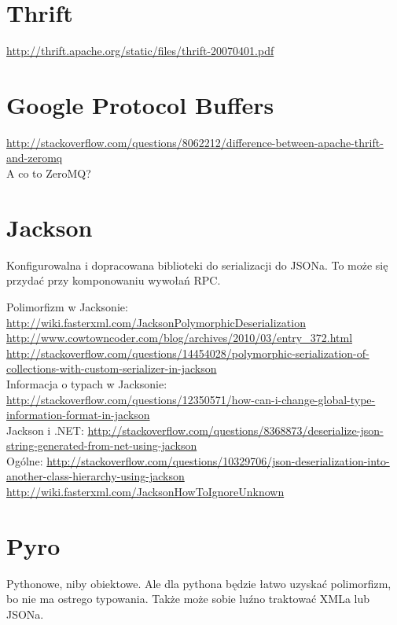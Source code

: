 \section{Thrift}
\url{http://thrift.apache.org/static/files/thrift-20070401.pdf}\\

\section{Google Protocol Buffers}
\url{http://stackoverflow.com/questions/8062212/difference-between-apache-thrift-and-zeromq}\\
A co to ZeroMQ?\\

\section{Jackson}
Konfigurowalna i dopracowana biblioteki do serializacji do JSONa. To może się przydać przy komponowaniu wywołań RPC.

Polimorfizm w Jacksonie:
\url{http://wiki.fasterxml.com/JacksonPolymorphicDeserialization}\\
\url{http://www.cowtowncoder.com/blog/archives/2010/03/entry_372.html}\\
\url{http://stackoverflow.com/questions/14454028/polymorphic-serialization-of-collections-with-custom-serializer-in-jackson}\\

Informacja o typach w Jacksonie:
\url{http://stackoverflow.com/questions/12350571/how-can-i-change-global-type-information-format-in-jackson}\\

Jackson i .NET:
\url{http://stackoverflow.com/questions/8368873/deserialize-json-string-generated-from-net-using-jackson}\\

Ogólne:
\url{http://stackoverflow.com/questions/10329706/json-deserialization-into-another-class-hierarchy-using-jackson}\\
\url{http://wiki.fasterxml.com/JacksonHowToIgnoreUnknown}\\

\section{Pyro}
Pythonowe, niby obiektowe. Ale dla pythona będzie łatwo uzyskać polimorfizm, bo nie ma ostrego typowania. Także może sobie luźno traktować XMLa lub JSONa.

